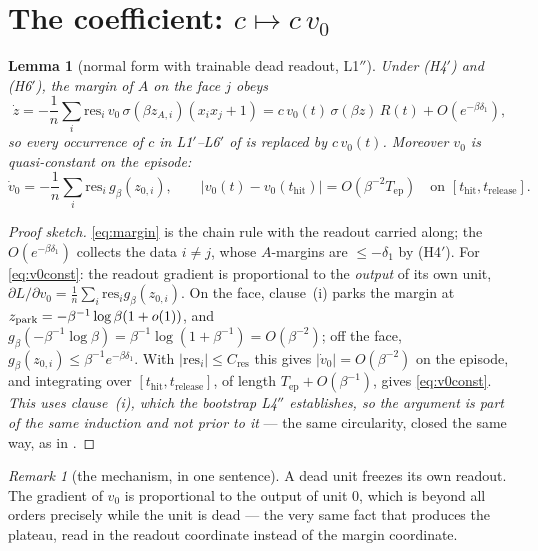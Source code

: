 \documentclass[11pt]{article}
\newtheorem{lemma}[theorem]{Lemma}
\theoremstyle{remark}
\newtheorem{remark}[theorem]{Remark}
\newcommand{\thit}{t_{\mathrm{hit}}}
\newcommand{\trel}{t_{\mathrm{release}}}
\newcommand{\Tep}{T_{\mathrm{ep}}}
\newcommand{\res}{\mathrm{res}}
\newcommand{\Cres}{C_{\mathrm{res}}}
\newcommand{\hyplabel}[1]{\textup{(#1)}}
\begin{document}
\section{\texorpdfstring{The coefficient: $c\mapsto c\,v_0$}{The coefficient: c -> c v0}}\label{sec:coef}

\begin{lemma}[normal form with trainable dead readout, L1$''$]\label{lem:L1}
Under \hyplabel{H4$'$} and \hyplabel{H6$'$}, the margin of $A$ on the face $j$
obeys
\begin{equation}\label{eq:margin}
\dot z=-\frac1n\sum_i \res_i\,v_0\,\sigma(\beta z_{A,i})(x_ix_j+1)
=c\,v_0(t)\,\sigma(\beta z)\,R(t)+O(e^{-\beta\delta_1}),
\end{equation}
so every occurrence of $c$ in L1$'$--L6$'$ of \cite{paper} is replaced by
$c\,v_0(t)$. Moreover $v_0$ is quasi-constant on the episode:
\begin{equation}\label{eq:v0const}
\dot v_0=-\frac1n\sum_i\res_i\,g_\beta(z_{0,i}),
\qquad
\bigl|v_0(t)-v_0(\thit)\bigr|=O(\beta^{-2}\Tep)\quad\text{on }[\thit,\trel].
\end{equation}
\end{lemma}

\begin{proof}[Proof sketch]
\eqref{eq:margin} is the chain rule with the readout carried along; the
$O(e^{-\beta\delta_1})$ collects the data $i\ne j$, whose $A$-margins are
$\le-\delta_1$ by \hyplabel{H4$'$}. For \eqref{eq:v0const}: the readout gradient
is proportional to the \emph{output} of its own unit,
$\partial L/\partial v_0=\frac1n\sum_i\res_ig_\beta(z_{0,i})$. On the face,
clause~(i) parks the margin at $z_{\rm park}=-\beta^{-1}\log\beta(1+o(1))$, and
$g_\beta(-\beta^{-1}\log\beta)=\beta^{-1}\log(1+\beta^{-1})=O(\beta^{-2})$; off
the face, $g_\beta(z_{0,i})\le\beta^{-1}e^{-\beta\delta_1}$. With
$|\res_i|\le\Cres$ this gives $|\dot v_0|=O(\beta^{-2})$ on the episode, and
integrating over $[\thit,\trel]$, of length $\Tep+O(\beta^{-1})$, gives
\eqref{eq:v0const}. \emph{This uses clause~(i), which the bootstrap L4$''$
establishes, so the argument is part of the same induction and not prior to it}
--- the same circularity, closed the same way, as in \cite[L4$'$]{paper}.
\end{proof}

\begin{remark}[the mechanism, in one sentence]
A dead unit freezes its own readout. The gradient of $v_0$ is proportional to
the output of unit $0$, which is beyond all orders precisely while the unit is
dead --- the very same fact that produces the plateau, read in the readout
coordinate instead of the margin coordinate.
\end{remark}
\end{document}
